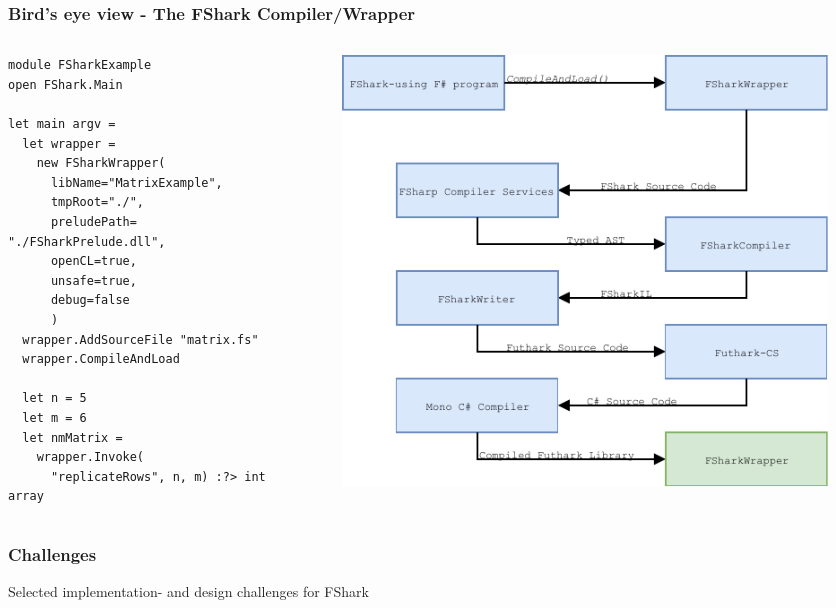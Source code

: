 \documentclass[10pt, compress, usenames, dvipsnames]{beamer}
\begin{document}
\begin{frame}[fragile]
  \frametitle{Bird's eye view - The FShark Compiler/Wrapper}
\begin{columns}[t] %
\begin{column}{.48\textwidth}
\begin{verbatim}
module FSharkExample
open FShark.Main

let main argv =
  let wrapper = 
    new FSharkWrapper(
      libName="MatrixExample",
      tmpRoot="./",
      preludePath= "./FSharkPrelude.dll",
      openCL=true,
      unsafe=true,
      debug=false
      )
  wrapper.AddSourceFile "matrix.fs"
  wrapper.CompileAndLoad

  let n = 5
  let m = 6
  let nmMatrix = 
    wrapper.Invoke(
      "replicateRows", n, m) :?> int array
\end{verbatim}
\end{column}
\hfill
\begin{column}{.60\textwidth}
  \begin{figure}
    \includegraphics[scale=0.7]{./images/pipeline/pipeline9}
  \end{figure}
\end{column}
\end{columns}
\end{frame}

\begin{frame}[plain]
  \frametitle{Challenges}
\begin{center}
  \Huge Selected implementation- and design challenges for FShark
\end{center}

\end{frame}
\end{document}
